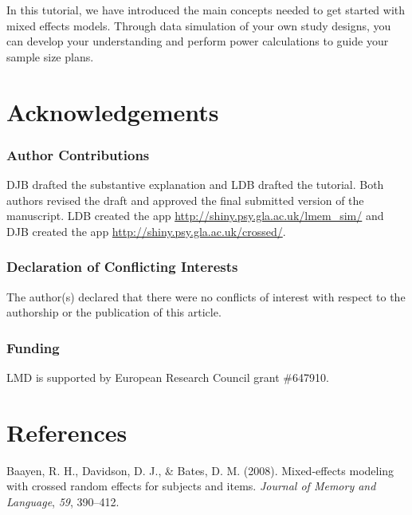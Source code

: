 \documentclass[doc,floatsintext]{apa6}
\begin{document}
In this tutorial, we have introduced the main concepts needed to get
started with mixed effects models. Through data simulation of your own
study designs, you can develop your understanding and perform power
calculations to guide your sample size plans.

\section{Acknowledgements}\label{acknowledgements}

\subsubsection{Author Contributions}\label{author-contributions}

DJB drafted the substantive explanation and LDB drafted the tutorial.
Both authors revised the draft and approved the final submitted version
of the manuscript. LDB created the app
\url{http://shiny.psy.gla.ac.uk/lmem_sim/} and DJB created the app
\url{http://shiny.psy.gla.ac.uk/crossed/}.

\subsubsection{Declaration of Conflicting
Interests}\label{declaration-of-conflicting-interests}

The author(s) declared that there were no conflicts of interest with
respect to the authorship or the publication of this article.

\subsubsection{Funding}\label{funding}

LMD is supported by European Research Council grant \#647910.

\newpage

\section{References}\label{references}

\begingroup
\setlength{\parindent}{-0.5in} \setlength{\leftskip}{0.5in}

\hypertarget{refs}{}
\hypertarget{ref-baayen_davidson_bates_2008}{}
Baayen, R. H., Davidson, D. J., \& Bates, D. M. (2008). Mixed-effects
modeling with crossed random effects for subjects and items.
\emph{Journal of Memory and Language}, \emph{59}, 390--412.
\end{document}
